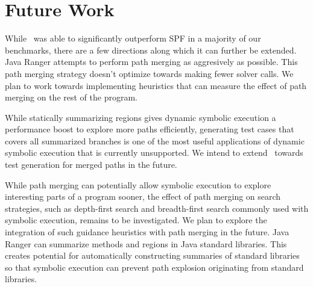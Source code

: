 \section{Future Work}
\label{sec:futureWork}
While \tool\ was able to significantly outperform SPF in a majority of our benchmarks, there are a few directions
along which it can further be extended.
%
Java Ranger attempts to perform path merging as aggresively as possible.
%
This path merging strategy doesn't optimize towards making fewer solver calls.
%
We plan to work towards implementing heuristics that can measure the effect of path merging on the rest of the program.

While statically summarizing regions gives dynamic symbolic execution a performance boost to explore more paths
efficiently, generating test cases that covers all summarized branches is one of the most useful applications of dynamic
symbolic execution that is currently unsupported.
%
We intend to extend \tool\ towards test generation for merged paths in the future.

While path merging can potentially allow symbolic execution to explore interesting parts of a program sooner, the
effect of path merging on search strategies, such as depth-first search and breadth-first search commonly used with
symbolic execution, remains to be investigated.
%
We plan to explore the integration of such guidance heuristics with path merging in the future.
%
Java Ranger can summarize methods and regions in Java standard libraries.
%
This creates potential for automatically constructing summaries of standard libraries so that symbolic execution
can prevent path explosion originating from standard libraries.
%